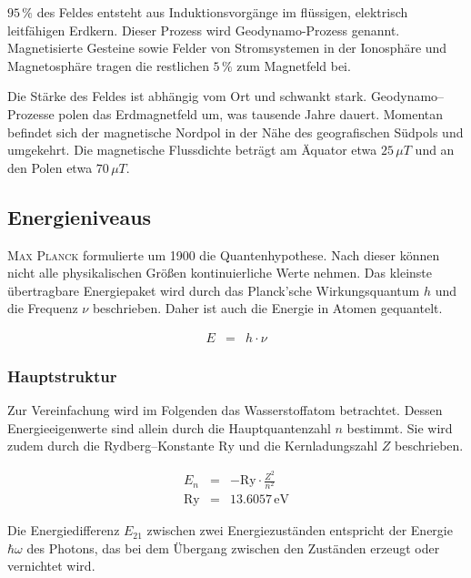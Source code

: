 \documentclass[12pt,a4paper]{scrartcl}
\numberwithin{equation}{section} %
\begin{document}
$95\,\%$ des Feldes entsteht aus Induktionsvorgänge im flüssigen, elektrisch leitfähigen Erdkern. Dieser Prozess wird Geodynamo-Prozess genannt. Magnetisierte Gesteine sowie Felder von Stromsystemen in der Ionosphäre und Magnetosphäre tragen die restlichen $5\,\%$ zum Magnetfeld bei.

Die Stärke des Feldes ist abhängig vom Ort und schwankt stark. Geodynamo--Prozesse polen das Erdmagnetfeld um, was tausende Jahre dauert. Momentan befindet sich der magnetische Nordpol in der Nähe des geografischen Südpols und umgekehrt. Die magnetische Flussdichte beträgt am Äquator etwa $25\,\mu T$ und an den Polen etwa $70\,\mu T$. \cite{Geomagnetismus}

\subsection{Energieniveaus}
\label{Energieniveaus}

\textsc{Max Planck} formulierte um 1900 die Quantenhypothese. Nach dieser können nicht alle physikalischen Größen kontinuierliche Werte nehmen. Das kleinste übertragbare Energiepaket wird durch das Planck'sche Wirkungsquantum $h$ und die Frequenz $\nu$ beschrieben. Daher ist auch die Energie in Atomen gequantelt.

\begin{eqnarray}
	E &=& h\cdot \nu \label{eq:Energie Strahlung}
\end{eqnarray}

\subsubsection{Hauptstruktur}
\label{Wasserstoffatom}
Zur Vereinfachung wird im Folgenden das Wasserstoffatom betrachtet. Dessen Energieeigenwerte sind allein durch die Hauptquantenzahl $n$ bestimmt. Sie wird zudem durch die Rydberg--Konstante $\mathrm{Ry}$ und die Kernladungszahl $Z$ beschrieben.

\begin{eqnarray}
	E_n &=& - \mathrm{Ry} \cdot \frac{Z^2}{n^2} \\
	\mathrm{Ry} &=& 13.6057 \mathrm{\,eV}
\end{eqnarray}

\noindent
Die Energiedifferenz $E_{21}$ zwischen zwei Energiezuständen entspricht der Energie $\hbar\omega$ des Photons, das bei dem Übergang zwischen den Zuständen erzeugt oder vernichtet wird.
\end{document}
